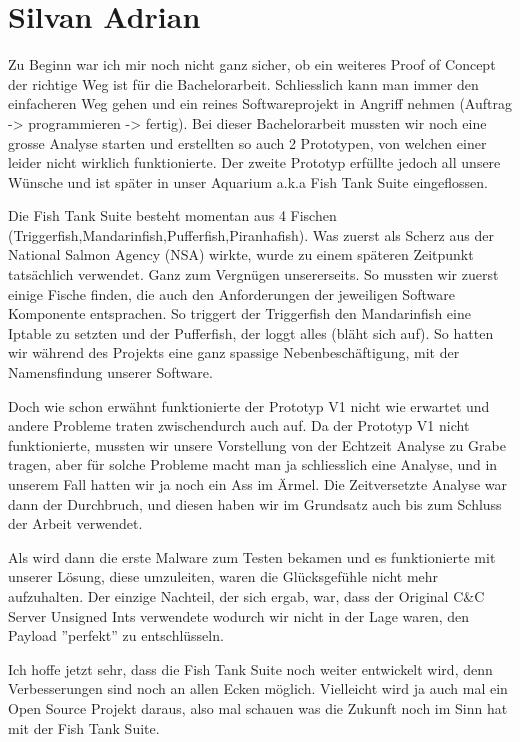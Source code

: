 \section{Silvan Adrian}

Zu Beginn war ich mir noch nicht ganz sicher, ob ein weiteres Proof of Concept der richtige Weg ist für die Bachelorarbeit.
Schliesslich kann man immer den einfacheren Weg gehen und ein reines Softwareprojekt in Angriff nehmen (Auftrag -> programmieren -> fertig).
Bei dieser Bachelorarbeit mussten wir noch eine grosse Analyse starten und erstellten so auch 2 Prototypen, von welchen einer leider nicht wirklich funktionierte.
Der zweite Prototyp erfüllte jedoch all unsere Wünsche und ist später in unser Aquarium a.k.a Fish Tank Suite eingeflossen.


Die Fish Tank Suite besteht momentan aus 4 Fischen (Triggerfish,Mandarinfish,Pufferfish,Piranhafish). Was zuerst als Scherz aus der National Salmon Agency (NSA) wirkte, wurde zu einem späteren Zeitpunkt tatsächlich verwendet.
Ganz zum Vergnügen unsererseits. So mussten wir zuerst einige Fische finden, die auch den Anforderungen der jeweiligen Software Komponente entsprachen. So triggert der Triggerfish den Mandarinfish eine Iptable zu setzten und der Pufferfish, der loggt alles (bläht sich auf).
So hatten wir während des Projekts eine ganz spassige Nebenbeschäftigung, mit der Namensfindung unserer Software.

Doch wie schon erwähnt funktionierte der Prototyp V1 nicht wie erwartet und andere Probleme traten zwischendurch auch auf.
Da der Prototyp V1 nicht funktionierte, mussten wir unsere Vorstellung von der Echtzeit Analyse zu Grabe tragen, aber für solche Probleme macht man ja schliesslich eine Analyse, und in unserem Fall hatten wir ja noch ein Ass im Ärmel.
Die Zeitversetzte Analyse war dann der Durchbruch, und diesen haben wir im Grundsatz auch bis zum Schluss der Arbeit verwendet.

Als wird dann die erste Malware zum Testen bekamen und es funktionierte mit unserer Lösung, diese umzuleiten, waren die Glücksgefühle nicht mehr aufzuhalten. Der einzige Nachteil, der sich ergab, war, dass der Original C\&C Server Unsigned Ints verwendete wodurch wir nicht in der Lage waren, den Payload ''perfekt'' zu entschlüsseln.


Ich hoffe jetzt sehr, dass die Fish Tank Suite noch weiter entwickelt wird, denn Verbesserungen sind noch an allen Ecken möglich.
Vielleicht wird ja auch mal ein Open Source Projekt daraus, also mal schauen was die Zukunft noch im Sinn hat mit der Fish Tank Suite.